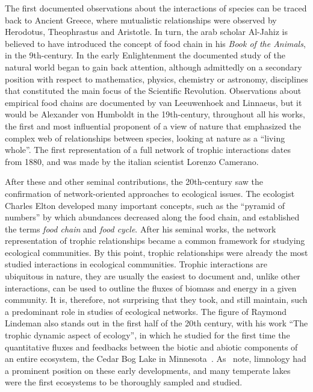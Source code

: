 The first documented observations about the interactions of species can be traced back to Ancient Greece, where mutualistic relationships were observed by Herodotus, Theophrastus and Aristotle. In turn, the arab scholar Al-Jahiz is believed to have introduced the concept of food chain in his \textit{Book of the Animals}, in the 9th-century. In the early Enlightenment the documented study of the natural world began to gain back attention, although admittedly on a secondary position with respect to mathematics, physics, chemistry or astronomy, disciplines that constituted the main focus of the Scientific Revolution. Observations about empirical food chains are documented by van Leeuwenhoek and Linnaeus, but it would be Alexander von Humboldt in the 19th-century, throughout all his works, the first and most influential proponent of a view of nature that emphasized the complex web of relationships between species, looking at nature as a ``living whole''. The first representation of a full network of trophic interactions dates from 1880, and was made by the italian scientist Lorenzo Camerano.

After these and other seminal contributions, the 20th-century saw the confirmation of network-oriented approaches to ecological issues. The ecologist Charles Elton developed many important concepts, such as the ``pyramid of numbers'' by which abundances decreased along the food chain, and established the terms \textit{food chain} and \textit{food cycle}. After his seminal works, the network representation of trophic relationships became a common framework for studying ecological communities. By this point, trophic relationships were already the most studied interactions in ecological communities. Trophic interactions are ubiquitous in nature, they are usually the easiest to document and, unlike other interactions, can be used to outline the fluxes of biomass and energy in a given community. It is, therefore, not surprising that they took, and still maintain, such a predominant role in studies of ecological networks. The figure of Raymond Lindeman also stands out in the first half of the 20th century, with his work ``The trophic dynamic aspect of ecology'', in which he studied for the first time the quantitative fluxes and feedbacks between the biotic and abiotic components of an entire ecosystem, the Cedar Bog Lake in Minnesota~\citep{Lindeman1942}. As~\cite{Ings2018} note, limnology had a prominent position on these early developments, and many temperate lakes were the first ecosystems to be thoroughly sampled and studied.

